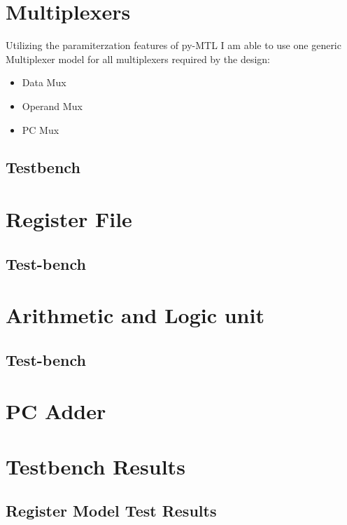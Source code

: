 \documentclass{article}
\begin{document}
\clearpage
\section{Multiplexers}
Utilizing the paramiterzation features of py-MTL I am able to use one generic Multiplexer model for all multiplexers required by the design:
\begin{itemize}
    \item Data Mux
    \item Operand Mux
    \item PC Mux
\end{itemize}

\subsection{Testbench}


\clearpage
\section{Register File}

\subsection{Test-bench}


\clearpage
\section{Arithmetic and Logic unit}

\subsection{Test-bench}


\section{PC Adder}

\section{Testbench Results}
\subsection{Register Model Test Results}

\end{document}
